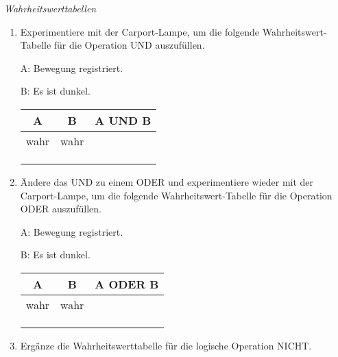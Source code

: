 \documentclass[ngerman, 11pt]{scrreprt}
\begin{document}
	\begin{aufgabe*} \emph{Wahrheitswerttabellen}
		\begin{enumerate}[label=\alph*), itemsep=0ex, parsep=0ex]
			\item Experimentiere mit der Carport-Lampe, um die folgende Wahrheitswert-Tabelle für die Operation UND auszufüllen.
			
			\medskip
			\begin{minipage}{0.4\textwidth}
				A: Bewegung registriert.
				
				B: Es ist dunkel.
			\end{minipage}
			\hfill
			\begin{minipage}{0.4\textwidth}
				\centering
				\begin{tabular}{c | c | c}
					\textbf{A} & \textbf{B} & \textbf{A UND B} \\ \hline
					wahr & wahr &  \\
					&  &  \\
					&  &  \\
					&  &  \\  
				\end{tabular}
			\end{minipage}
			\hfill
			
			\medskip
			\item Ändere das UND zu einem ODER und experimentiere wieder mit der Carport-Lampe, um die folgende Wahrheitswert-Tabelle für die Operation ODER auszufüllen.
			
			\medskip
			\begin{minipage}{0.4\textwidth}
				A: Bewegung registriert.
				
				B: Es ist dunkel.
			\end{minipage}
			\hfill
			\begin{minipage}{0.4\textwidth}
				\centering
				\begin{tabular}{c | c | c}
					\textbf{A} & \textbf{B} & \textbf{A ODER B} \\ \hline
					wahr & wahr &  \\
					&  &  \\
					&  &  \\
					&  &  \\  
				\end{tabular}
			\end{minipage}
			\hfill
			
			\medskip
			\item Ergänze die Wahrheitswerttabelle für die logische Operation NICHT.
			

\end{enumerate}
\end{aufgabe*}
\end{document}
